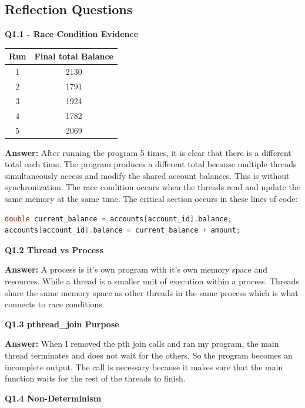 \documentclass[12pt]{article}
\begin{document}
\subsection{Reflection Questions}
\textbf{Q1.1 - Race Condition Evidence} 

\begin{center}
\begin{tabular}{|c|c|}
\hline
Run & Final total Balance \\
\hline
1 & 2130 \\
2 & 1791 \\
3 & 1924 \\
4 & 1782 \\
5 & 2069 \\
\hline
\end{tabular}
\end{center}

\textbf{Answer:}
After running the program 5 times, it is clear that there is a different total each time. The program produces a different total because multiple threads simultaneously access and modify the shared account balances. This is without synchronization. The race condition occurs when the threads read and update the same memory at the same time.
The critical section occurs in these lines of code:

\begin{lstlisting}[language=C]
double current_balance = accounts[account_id].balance;
accounts[account_id].balance = current_balance + amount;
\end{lstlisting}

\bigskip 

\textbf{Q1.2 Thread vs Process}

\textbf{Answer:}
A process is it's own program with it's own memory space and resources. While a thread is a smaller unit of execution within a process. Threads share the same memory space as other threads in the same process which is what connects to race conditions.

\bigskip

\textbf{Q1.3 pthread\_join Purpose}

\textbf{Answer:}
When I removed the pth join calls and ran my program, the main thread terminates and does not wait for the others. So the program becomes an incomplete output. The call is necessary because it makes sure that the main function waits for the rest of the threads to finish.

\bigskip

\textbf{Q1.4 Non-Determinism}
\end{document}
